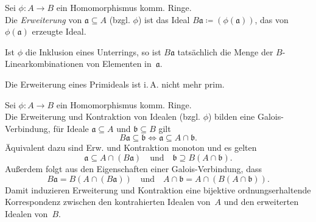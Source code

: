 \documentclass{cheat-sheet}
\newcommand{\aaa}{\mathfrak{a}}
\newcommand{\bbb}{\mathfrak{b}}
\begin{document}

\begin{defn}
  Sei $\phi : A \to B$ ein Homomorphismus komm. Ringe. \\
  Die \emph{Erweiterung} von $\aaa \subseteq A$ (bzgl. $\phi$) ist das Ideal $B \aaa \coloneqq (\phi(\aaa))$, das von $\phi(\aaa)$ erzeugte Ideal.
\end{defn}

\begin{bem}
  Ist $\phi$ die Inklusion eines Unterrings, so ist $B \aaa$ tatsächlich die Menge der $B$-Linearkombinationen von Elementen in~$\aaa$.
\end{bem}

\begin{bem}
  Die Erweiterung eines Primideals ist i.\,A. nicht mehr prim.
\end{bem}


\begin{prop}
  Sei $\phi : A \to B$ ein Homomorphismus komm. Ringe. \\
  Die Erweiterung und Kontraktion von Idealen (bzgl. $\phi$) bilden eine Galois-Verbindung, \dh{} für Ideale $\aaa \subseteq A$ und $\bbb \subseteq B$ gilt
  \[
    B \aaa \subseteq \bbb \iff \aaa \subseteq A \cap \bbb.
  \]
  Äquivalent dazu sind Erw. und Kontraktion monoton und es gelten
  \[
    \aaa \subseteq A \cap (B \aaa)
    \quad \text{und} \quad
    \bbb \supseteq B (A \cap \bbb).
  \]
  Außerdem folgt aus den Eigenschaften einer Galois-Verbindung, dass
  \[
    B \aaa = B (A \cap (B \aaa))
    \quad \text{und} \quad
    A \cap \bbb = A \cap (B (A \cap \bbb)).
  \]
  Damit induzieren Erweiterung und Kontraktion eine bijektive ordnungserhaltende Korrespondenz zwischen den kontrahierten Idealen von~$A$ und den erweiterten Idealen von~$B$.
\end{prop}
\end{document}
